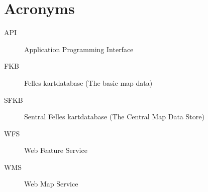 
\chapter{Acronyms}
\begin{description}
	\item[API] Application Programming Interface
	\item[FKB] Felles kartdatabase (The basic map data)
	\item[SFKB] Sentral Felles kartdatabase (The Central Map Data Store)
	\item[WFS] Web Feature Service
	\item[WMS] Web Map Service
\end{description}